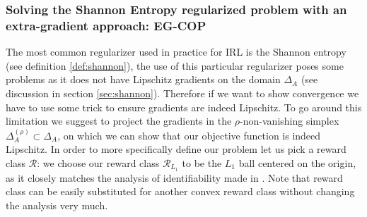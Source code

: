 
\subsubsection{Solving the Shannon Entropy regularized problem with an extra-gradient approach: EG-COP}


The most common regularizer used in practice for IRL is the Shannon entropy (see definition \ref{def:shannon}), the use of this particular regularizer poses some problems as it does not have Lipschitz gradients on the domain $\Delta_A$ (see discussion in section \ref{sec:shannon}). Therefore if we want to show convergence we have to use some trick to ensure gradients are indeed Lipschitz. To go around this limitation we suggest to project the gradients in the $\rho$-non-vanishing simplex $\Delta^{(\rho)}_A \subset \Delta_A$, on which we can show that our objective function is indeed Lipschitz. In order to more specifically define our problem let us pick a reward class $\mathcal{R}$: we choose our reward class $\mathcal{R}_{L_1}$ to be the $L_1$ ball centered on the origin, as it closely matches the analysis of identifiability made in \cite{Schlaginhaufen2023}. Note that reward class can be easily substituted for another convex reward class without changing the analysis very much. \\

